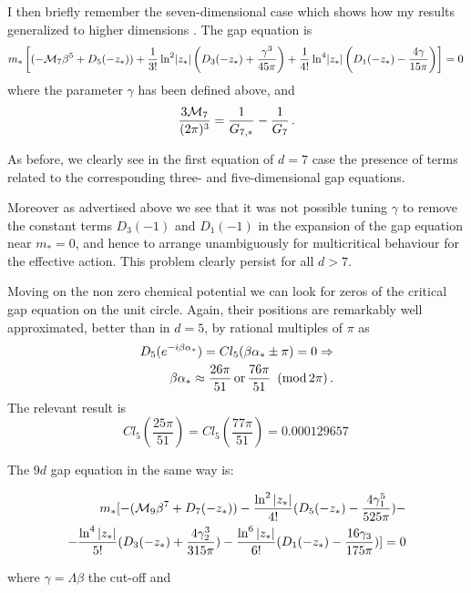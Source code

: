 \documentclass[twoside]{article}
\begin{document}
I then briefly remember the seven-dimensional case which shows how my results generalized to higher dimensions \cite{Filothodoros:2018}. The gap equation is
\begin{align}
m_*\left[(-{\cal M}_7\beta^5+D_5(-z_*))+\frac{1}{3!}\ln^2\!|z_*|\left(D_3(-z_*)+\frac{\gamma^3}{45\pi}\right)
+\frac{1}{4!}\ln^4\!|z_*|\left(D_1(-z_*)-\frac{4\gamma}{15\pi}\right)\right]=0\,
\end{align}
where the parameter $\gamma$ has been defined above, 
and 
\begin{equation}
\frac{3{\cal M}_7}{(2\pi)^3}=\frac{1}{G_{7,*}}-\frac{1}{G_7}\,.
\end{equation}

As before, we clearly see in the first equation of $d=7$ case the presence of terms related to the corresponding three- and five-dimensional gap equations.

Moreover as advertised above we see that it was not possible tuning $\gamma$ to remove the constant terms $D_3(-1)$ and $D_1(-1)$ in the expansion of the gap equation near $m_*=0$, and hence to arrange unambiguously for multicritical behaviour for the effective action. This problem clearly persist for all $d>7$. 

Moving on the non zero chemical potential we can look for zeros of the critical gap equation on the unit circle. Again, their positions are remarkably well approximated, better than in $d=5$, by rational multiples of $\pi$ as
\begin{align}
\nonumber D_5(e^{-i\beta\alpha_*})=Cl_5(\beta\alpha_*\pm \pi)=0\Rightarrow \\
 \beta\alpha_*\approx \frac{26\pi}{51}\,{\rm or}\,\frac{76\pi}{51} \,\,\,({\rm mod}\,2\pi)\,.
\end{align}
The relevant result is 
\begin{equation}
Cl_5\left(\frac{25\pi}{51}\right)=Cl_5\left(\frac{77\pi}{51}\right)=0.000129657\,
\end{equation}

The $9d$ gap equation in the same way is:

\begin{align}
m_*[-({\cal M}_9\beta^7+D_7(-z_*))-\frac{\ln^2|z_*|}{4!}(D_5(-z_*)-\frac{4\gamma_1^5}{525\pi})-\\
-\frac{\ln^4|z_*|}{5!}(D_3(-z_*)+\frac{4\gamma_2^3}{315\pi})-\frac{\ln^6|z_*|}{6!}(D_1(-z_*)-\frac{16\gamma_3}{175\pi})]=0
\end{align}

where $\gamma=\Lambda\beta$ the cut-off and
\end{document}
